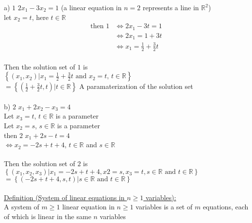 \documentclass{jhwhw}
\begin{document}
a) \(\boxed{1}\) \(2x_1 - 3x_2 = 1\) (a linear equation in \(n=2\) represents a line in \(\mathbb{R} ^2\))
\\
let \(x_2=t\), here \(t \in \mathbb{R}\)
\\

\begin{align*} 
\text{then } \boxed{1} &\Leftrightarrow 2x_1 - 3t = 1 \\
&\Leftrightarrow 2x_1 = 1 + 3t \\
&\Leftrightarrow x_1 = \frac{1}{2} + \frac{3}{2}t \\
\end{align*}

Then the solution set of \(\boxed{1}\) is 
\\
\(\left\{(x_1 , x_2) | x_1 = \frac{1}{2} + \frac{3}{2}t \text{ and } x_2 = t \text{, } t \in \mathbb{R} \right\}\)
\\
\(\boxed{= \left\{\left(\frac{1}{2} + \frac{3}{2}t, t\right) | t \in \mathbb{R} \right\}}\) A paramaterization of the solution set
\\ \\

b) \(\boxed{2}\) \(x_1 + 2x_2 - x_3 = 4\)
\\
Let \(x_3 = t\), \(t \in \mathbb{R}\) is a parameter
\\
Let \(x_2 = s\), \(s \in \mathbb{R}\) is a parameter
\\

then \(\boxed{2}\) \(x_1 + 2s - t = 4\) \\
\(\Leftrightarrow x_2 = -2s + t + 4\), \(t \in \mathbb{R}\) and \(s \in \mathbb{R}\)
\\ \\
Then the solution set of \(\boxed{2}\) is \\
\(\left\{(x_1, x_2, x_3) | x_1 = -2s + t + 4, x2 = s, x_3 = t, s \in \mathbb{R} \text{ and } t \in \mathbb{R} \right\}\)
\\
\(\boxed{= \left\{(-2s + t + 4, s, t) | s \in \mathbb{R} \text{ and } t \in \mathbb{R} \right\}}\)
\\ \\

\underline{Definition (System of linear equations in \(n \geq 1\) variables):}
\\

A system of \(m \geq 1\) linear equation in \(n \geq 1\) variables is a set of \(m\) equations, each of which is linear in the same \(n\) variables
\\
\end{document}
